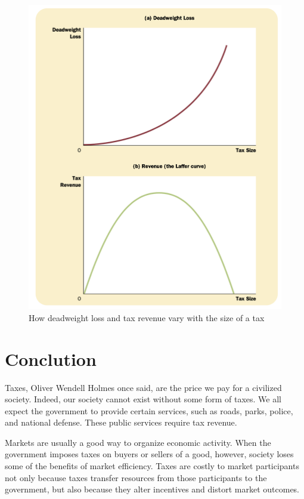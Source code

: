 \begin{figure}[!ht]
  \centering
  \includegraphics[width=\textwidth]{pics/deadweight-loss-and-tax-revenue-vary}
  \caption[Size of tax]{How deadweight loss and tax revenue vary with the size of a tax}
  \label{fig:size-of-tax}
\end{figure}



\section{Conclution}

Taxes, Oliver Wendell Holmes once said, are the price we pay for a civilized society.
Indeed, our society cannot exist without some form of taxes.
We all expect the government to provide certain services, such as roads, parks, police, and national defense.
These public services require tax revenue.



Markets are usually a good way to organize economic activity.
When the government imposes taxes on buyers or sellers of a good, however, society loses some of the benefits of market efficiency.
Taxes are costly to market participants not only because taxes transfer resources from those participants to the government, but also because they alter incentives and distort market outcomes.